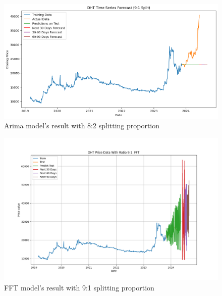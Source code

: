 \documentclass{ieeeojies}
\begin{document}
\begin{figure}[H]
  \centering
  \begin{minipage}{0.8\linewidth}
    \centering
    \includegraphics[width=\linewidth]{bibliography/Figure/DHT_ARIMA.png}
    \caption{Arima model's result with 8:2 splitting proportion}
    \label{fig8}
  \end{minipage}
\end{figure}

\begin{figure}[H]
  \centering
  \begin{minipage}{0.8\linewidth}
    \centering
    \includegraphics[width=\linewidth]{bibliography/Figure/FFT_91_DHT.png}
    \caption{FFT model's result with 9:1 splitting proportion}
    \label{fig8}
  \end{minipage}
\end{figure}
\end{document}
